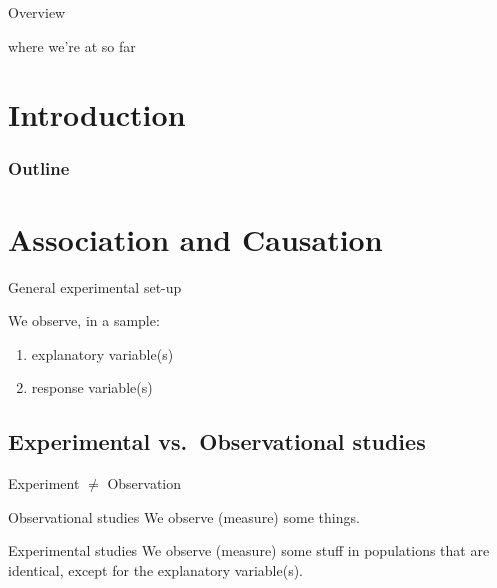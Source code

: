 
\subtitle{and One--sided $t$-tests}

\date{17 October 2013}




\begin{frame}
  \maketitle
\end{frame}

\begin{frame}{Overview}

where we're at so far

\end{frame}

\section*{Introduction}
\begin{frame}\frametitle<presentation>{Outline}
  \tableofcontents
\end{frame}


\section{Association and Causation}
\begin{frame}{General experimental set-up}

We observe, in a sample:
  \begin{enumerate}
  \item explanatory variable(s)
  \item response variable(s)
  \end{enumerate}

\end{frame}


\subsection{Experimental vs.\ Observational studies}

\begin{frame}{Experiment $\neq$ Observation}

  \begin{block}{Observational studies}
    We \alert{observe} (measure) some things.
  \end{block}

  \begin{block}{Experimental studies}
    We observe (measure) some stuff in populations that are identical,
    except for the explanatory variable(s).
  \end{block}


\end{frame}


